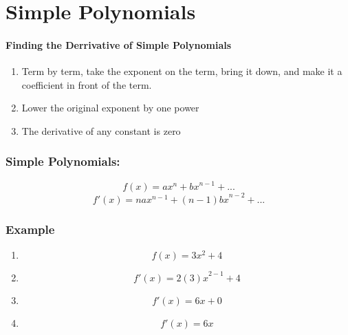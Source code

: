\documentclass[a4paper,11pt]{book}
\begin{document}
\section{Simple Polynomials}
\paragraph{Finding the Derrivative of Simple Polynomials}
\normalsize 
\begin{enumerate}
  \item Term by term, take the exponent on the term, bring it down, and make it a coefficient in front of the term.
  \item Lower the original exponent by one power
  \item The derivative of any constant is zero
\end{enumerate}

\subsubsection{Simple Polynomials:}
\LARGE 
\[ f(x) = ax^n + {bx}^{n-1} + ... \]
\[ f'(x) = {nax}^{n-1} + {(n-1)bx}^{n-2} + ... \]

\subsubsection{Example}
\LARGE 
\begin{enumerate}
  \item \[ f(x) = 3x^2 + 4 \]
  \item \[ f'(x) = {2(3)x}^{2-1} + 4 \]
  \item \[ f'(x) = 6x + 0 \]
  \item \[ f'(x) = 6x \] 
\end{enumerate}
\normalsize 
\end{document}
